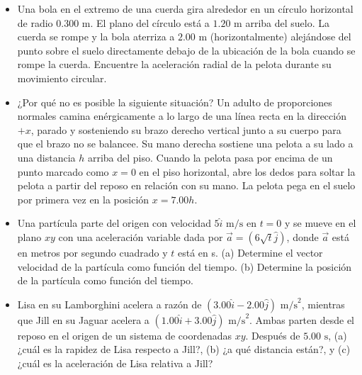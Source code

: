\documentclass[11pt,a4paper]{article}
\begin{document}
\begin{itemize}
    \item[\textbf{34.}] Una bola en el extremo de una cuerda gira alrededor en un círculo horizontal de radio $0.300 \text{ m}$. El plano del círculo está a $1.20 \text{ m}$ arriba del suelo. La cuerda se rompe y la bola aterriza a $2.00 \text{ m}$ (horizontalmente) alejándose del punto sobre el suelo directamente debajo de la ubicación de la bola cuando se rompe la cuerda. Encuentre la aceleración radial de la pelota durante su movimiento circular.
    \vspace*{6cm}

    \item[\textbf{35.}] ¿Por qué no es posible la siguiente situación? Un adulto de proporciones normales camina enérgicamente a lo largo de una línea recta en la dirección $+x$, parado y sosteniendo su brazo derecho vertical junto a su cuerpo para que el brazo no se balancee. Su mano derecha sostiene una pelota a su lado a una distancia $h$ arriba del piso. Cuando la pelota pasa por encima de un punto marcado como $x = 0$ en el piso horizontal, abre los dedos para soltar la pelota a partir del reposo en relación con su mano. La pelota pega en el suelo por primera vez en la posición $x = 7.00h$.
    \vspace*{6cm}

    \item[\textbf{36.}] Una partícula parte del origen con velocidad $5\hat{i} \text{ m/s}$ en $t = 0$ y se mueve en el plano $xy$ con una aceleración variable dada por $\vec{a} = (6\sqrt{t}\hat{j})$, donde $\vec{a}$ está en metros por segundo cuadrado y $t$ está en s. (a) Determine el vector velocidad de la partícula como función del tiempo. (b) Determine la posición de la partícula como función del tiempo.
    \vspace*{6cm}

    \item[\textbf{37.}] Lisa en su Lamborghini acelera a razón de $(3.00\hat{i} - 2.00\hat{j}) \text{ m/s}^2$, mientras que Jill en su Jaguar acelera a $(1.00\hat{i} + 3.00\hat{j}) \text{ m/s}^2$. Ambas parten desde el reposo en el origen de un sistema de coordenadas $xy$. Después de $5.00 \text{ s}$, (a) ¿cuál es la rapidez de Lisa respecto a Jill?, (b) ¿a qué distancia están?, y (c) ¿cuál es la aceleración de Lisa relativa a Jill?
    \vspace*{6cm}
\end{itemize}

\newpage
\end{document}
